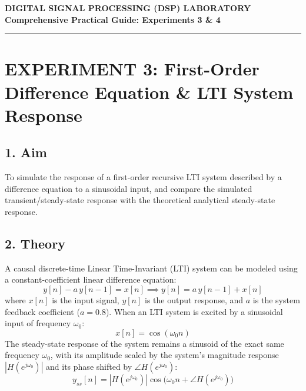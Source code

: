 \documentclass[11pt,a4paper]{article}
\begin{document}
\begin{center}
    {\Large \textbf{\textcolor{headcolor}{DIGITAL SIGNAL PROCESSING (DSP) LABORATORY}}}\\[0.2cm]
    {\large \textbf{Comprehensive Practical Guide: Experiments 3 \& 4}}\\[0.1cm]
    \rule{\linewidth}{0.5mm}
\end{center}

\vspace{0.2cm}

\section*{\textcolor{headcolor}{EXPERIMENT 3: First-Order Difference Equation \& LTI System Response}}

\subsection*{1. Aim}
To simulate the response of a first-order recursive LTI system described by a difference equation to a sinusoidal input, and compare the simulated transient/steady-state response with the theoretical analytical steady-state response.

\subsection*{2. Theory}
A causal discrete-time Linear Time-Invariant (LTI) system can be modeled using a constant-coefficient linear difference equation:
\begin{equation}
    y[n] - a\,y[n-1] = x[n] \implies y[n] = a\,y[n-1] + x[n]
\end{equation}
where $x[n]$ is the input signal, $y[n]$ is the output response, and $a$ is the system feedback coefficient ($a = 0.8$).
When an LTI system is excited by a sinusoidal input of frequency $\omega_0$:
\begin{equation}
    x[n] = \cos(\omega_0 n)
\end{equation}
The steady-state response of the system remains a sinusoid of the exact same frequency $\omega_0$, with its amplitude scaled by the system's magnitude response $|H(e^{j\omega_0})|$ and its phase shifted by $\angle H(e^{j\omega_0})$:
\begin{equation}
    y_{ss}[n] = |H(e^{j\omega_0})| \cos\big(\omega_0 n + \angle H(e^{j\omega_0})\big)
\end{equation}
\end{document}
